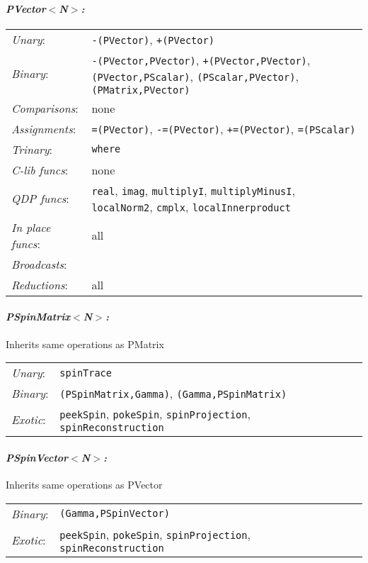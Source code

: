 \documentclass[12pt,letterpaper]{article}
\begin{document}
\paragraph{\bf\em PVector$<$N$>$:}
\begin{flushleft}
  \begin{tabular}{lp{5.0in}}
  {\em Unary}:& {\tt -(PVector)}, {\tt +(PVector)}\\
  {\em Binary}:& {\tt -(PVector,PVector)}, {\tt +(PVector,PVector)}, 
       {\tt *(PVector,PScalar)}, {\tt *(PScalar,PVector)}, {\tt *(PMatrix,PVector)}\\
  {\em Comparisons}:& none\\
  {\em Assignments}:& {\tt =(PVector)}, {\tt -=(PVector)}, {\tt +=(PVector)}, 
       {\tt *=(PScalar)}\\
  {\em Trinary}:& {\tt where}\\
  {\em C-lib funcs}:& none\\
  {\em QDP funcs}:& {\tt real}, {\tt imag}, {\tt multiplyI}, {\tt multiplyMinusI}, 
        {\tt localNorm2}, {\tt cmplx}, {\tt localInnerproduct}\\
  {\em In place funcs}:& all\\
  {\em Broadcasts}:& {\tt =(Zero)\\
  {\em Reductions}:& all\\
  \end{tabular}
\end{flushleft}

\paragraph{\bf\em PSpinMatrix$<$N$>$:}
  Inherits same operations as PMatrix
\begin{flushleft}
  \begin{tabular}{lp{5.0in}}
  {\em Unary}:& {\tt spinTrace}\\
  {\em Binary}:& {\tt *(PSpinMatrix,Gamma)}, {\tt *(Gamma,PSpinMatrix)}\\
  {\em Exotic}:& {\tt peekSpin}, {\tt pokeSpin}, {\tt spinProjection}, 
      {\tt spinReconstruction}\\
  \end{tabular}
\end{flushleft}

\paragraph{\bf\em PSpinVector$<$N$>$:}
  Inherits same operations as PVector
\begin{flushleft}
  \begin{tabular}{lp{5.0in}}
  {\em Binary}:& {\tt *(Gamma,PSpinVector)}\\
  {\em Exotic}:& {\tt peekSpin}, {\tt pokeSpin}, {\tt spinProjection}, 
      {\tt spinReconstruction}\\
  \end{tabular}
\end{flushleft}
\end{document}
